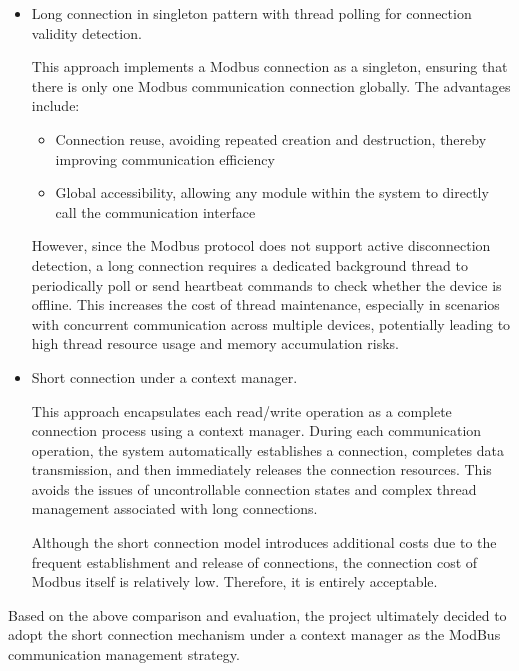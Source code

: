 \documentclass[
	english,
	ruledheaders=section,%
	class=report,%
	thesis={type=Report},%
	accentcolor=9c,%
	custommargins=true,%
	marginpar=false,%
	parskip=half-,%
	fontsize=11pt,%
	logofile={img/tuda_logo.pdf}, %
]{tudapub}
\begin{document}
\begin{itemize}
    \item Long connection in singleton pattern with thread polling for connection validity detection.  
    
    This approach implements a Modbus connection as a singleton, ensuring that there is only one Modbus communication connection globally. The advantages include: 
    \begin{itemize}
        \item Connection reuse, avoiding repeated creation and destruction, thereby improving communication efficiency
        \item Global accessibility, allowing any module within the system to directly call the communication interface
    \end{itemize}

    However, since the Modbus protocol does not support active disconnection detection, a long connection requires a dedicated background thread to periodically poll or send heartbeat commands to check whether the device is offline. This increases the cost of thread maintenance, especially in scenarios with concurrent communication across multiple devices, potentially leading to high thread resource usage and memory accumulation risks.

    \item Short connection under a context manager.
    
    This approach encapsulates each read/write operation as a complete connection process using a context manager. During each communication operation, the system automatically establishes a connection, completes data transmission, and then immediately releases the connection resources. This avoids the issues of uncontrollable connection states and complex thread management associated with long connections.  

    Although the short connection model introduces additional costs due to the frequent establishment and release of connections, the connection cost of Modbus itself is relatively low. Therefore, it is entirely acceptable.
\end{itemize}

Based on the above comparison and evaluation, the project ultimately decided to adopt the short connection mechanism under a context manager as the ModBus communication management strategy.
\end{document}

